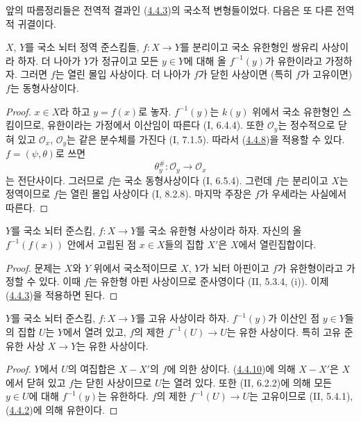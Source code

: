 앞의 따름정리들은 전역적 결과인
(\hyperref[III.4.4.3-fr]{4.4.3})의 국소적 변형들이었다. 다음은
또 다른 전역적 귀결이다.

\begin{corollary}[4.4.9]
\label{III.4.4.9-fr}
$X$, $Y$를 국소 뇌터 정역 준스킴들, $f:X\to Y$를 분리이고 국소
유한형인 쌍유리 사상이라 하자. 더 나아가 $Y$가 정규이고 모든
$y\in Y$에 대해 올 $f^{-1}(y)$가 유한이라고 가정하자. 그러면
$f$는 열린 몰입 사상이다. 더 나아가 $f$가 닫힌 사상이면
(특히 $f$가 고유이면) $f$는 동형사상이다.
\end{corollary}

\begin{proof}
$x\in X$라 하고 $y=f(x)$로 놓자. $f^{-1}(y)$는 $k(y)$ 위에서
국소 유한형인 스킴이므로, 유한이라는 가정에서 이산임이 따른다
(I, 6.4.4). 또한 $\mathcal O_y$는 정수적으로 닫혀 있고
$\mathcal O_x$, $\mathcal O_y$는 같은 분수체를 가진다 (I, 7.1.5).
따라서 (\hyperref[III.4.4.8-fr]{4.4.8})을 적용할 수 있다.
$f=(\psi,\theta)$로 쓰면
\[
\theta_y^\#:\mathcal O_y\longrightarrow\mathcal O_x
\]
는 전단사이다. 그러므로 $f$는 국소 동형사상이다 (I, 6.5.4).
그런데 $f$는 분리이고 $X$는 정역이므로 $f$는 열린 몰입 사상이다
(I, 8.2.8). 마지막 주장은 $f$가 우세라는 사실에서 따른다.
\end{proof}

\begin{proposition}[4.4.10]
\label{III.4.4.10-fr}
$Y$를 국소 뇌터 준스킴, $f:X\to Y$를 국소 유한형 사상이라 하자.
자신의 올 $f^{-1}(f(x))$ 안에서 고립된 점 $x\in X$들의 집합 $X'$은
$X$에서 열린집합이다.
\end{proposition}

\begin{proof}
문제는 $X$와 $Y$ 위에서 국소적이므로 $X$, $Y$가 뇌터 아핀이고
$f$가 유한형이라고 가정할 수 있다. 이때 $f$는 유한형 아핀
사상이므로 준사영이다 (II, 5.3.4, (i)). 이제
(\hyperref[III.4.4.3-fr]{4.4.3})을 적용하면 된다.
\end{proof}


\begin{corollary}[4.4.11]
\label{III.4.4.11-fr}
$Y$를 국소 뇌터 준스킴, $f:X\to Y$를 고유 사상이라 하자.
$f^{-1}(y)$가 이산인 점 $y\in Y$들의 집합 $U$는 $Y$에서 열려 있고,
$f$의 제한 $f^{-1}(U)\to U$는 유한 사상이다. 특히 고유 준유한
사상 $X\to Y$는 유한 사상이다.
\end{corollary}

\begin{proof}
$Y$에서 $U$의 여집합은 $X-X'$의 $f$에 의한 상이다.
(\hyperref[III.4.4.10-fr]{4.4.10})에 의해 $X-X'$은 $X$에서
닫혀 있고 $f$는 닫힌 사상이므로 $U$는 열려 있다. 또한
(II, 6.2.2)에 의해 모든 $y\in U$에 대해 $f^{-1}(y)$는 유한하다.
$f$의 제한 $f^{-1}(U)\to U$는 고유이므로 (II, 5.4.1),
(\hyperref[III.4.4.2-fr]{4.4.2})에 의해 유한이다.
\end{proof}

